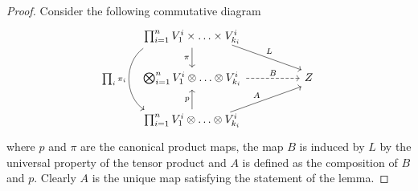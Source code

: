 \begin{proof}
    Consider the following commutative diagram
    \[\begin{tikzcd}
	{\prod_{i=1}^n V_1^i \times \ldots \times V_{k_i}^i} \\
	{\bigotimes_{i=1}^n V_1^i \otimes \ldots \otimes V_{k_i}^i} && Z \\
	{\prod_{i=1}^n V_1^i \otimes \ldots \otimes V_{k_i}^i}
	\arrow["\pi"', from=1-1, to=2-1]
	\arrow["L", shift left=2, shorten <=6pt, from=1-1, to=2-3]
	\arrow["{\prod_i\pi_i}"', shift right=12, bend right = 55, from=1-1, to=3-1]
	\arrow["B", dashed, from=2-1, to=2-3]
	\arrow["p", from=3-1, to=2-1]
	\arrow["A", shift right=2, shorten <=6pt, from=3-1, to=2-3]
\end{tikzcd}\]
where $p$ and $\pi$ are the canonical product maps, the map $B$ is induced by $L$ by the universal property of the tensor product and $A$ is defined as the composition of $B$ and $p$. Clearly $A$ is the unique map satisfying the statement of the lemma.
\end{proof}